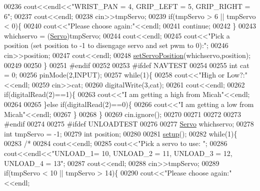 \begin{DoxyCode}
00236         cout<<endl<<\textcolor{stringliteral}{"WRIST\_PAN = 4, GRIP\_LEFT = 5, GRIP\_RIGHT = 6"};
00237         cout<<endl;
00238         cin>>tmpServo;
00239         \textcolor{keywordflow}{if}(tmpServo > 6 || tmpServo < 0)\{
00240             cout<<\textcolor{stringliteral}{"Please choose again:"}<<endl;
00241             \textcolor{keywordflow}{continue};
00242         \}
00243         whichservo = (\hyperlink{Servo__Position__Shell_8h_af629c4ae98db77091b130c7fbc31cab2}{Servo})tmpServo;
00244         cout<<endl;
00245         cout<<\textcolor{stringliteral}{"Pick a position (set position to -1 to disengage servo and set pwm to 0):"};
00246         cin>>position;
00247         cout<<endl;
00248         \hyperlink{Servo__Position__Shell_8cpp_abd2cd3c2e36d42a2178a6f2fd12af905}{setServoPosition}(whichservo,position);
00249         
00250     \}
00251 \textcolor{preprocessor}{#endif     }
00252 
00253 \textcolor{preprocessor}{#ifdef NAVTEST}
00254 
00255     \textcolor{keywordtype}{int} cat = 0;
00256     pinMode(2,INPUT);
00257     \textcolor{keywordflow}{while}(1)\{
00258         cout<<\textcolor{stringliteral}{"High or Low?:"}<<endl;
00259         cin>>cat;
00260         digitalWrite(3,cat);
00261         cout<<endl;
00262         \textcolor{keywordflow}{if}(digitalRead(2)==1)\{
00263             cout<<\textcolor{stringliteral}{"I am getting a high from Micah"}<<endl;
00264            
00265         \}\textcolor{keywordflow}{else} \textcolor{keywordflow}{if}(digitalRead(2)==0)\{
00266             cout<<\textcolor{stringliteral}{"I am getting a low from Micah"}<<endl;
00267         \}
00268     \} 
00269     cin.ignore();
00270 
00271     
00272     
00273 \textcolor{preprocessor}{#endif}
00274 
00275 \textcolor{preprocessor}{#ifdef UNLOADTEST}
00276     
00277     \hyperlink{Servo__Position__Shell_8h_af629c4ae98db77091b130c7fbc31cab2}{Servo} whichservo;
00278     \textcolor{keywordtype}{int} tmpServo = -1;
00279     \textcolor{keywordtype}{int} position;
00280 
00281     \hyperlink{Servo__Position__Shell_8cpp_a4fc01d736fe50cf5b977f755b675f11d}{setup}();
00282     \textcolor{keywordflow}{while}(1)\{
00283         \textcolor{comment}{/*}
00284 \textcolor{comment}{        cout<<endl;}
00285 \textcolor{comment}{        cout<<"Pick a servo to use: ";}
00286 \textcolor{comment}{        cout<<endl<<"UNLOAD\_1= 10, UNLOAD\_2 = 11, UNLOAD\_3 = 12, UNLOAD\_4 = 13";}
00287 \textcolor{comment}{        cout<<endl;}
00288 \textcolor{comment}{        cin>>tmpServo;}
00289 \textcolor{comment}{        if(tmpServo < 10 || tmpServo > 14)\{}
00290 \textcolor{comment}{            cout<<"Please choose again:"<<endl;}

\end{DoxyCode}
